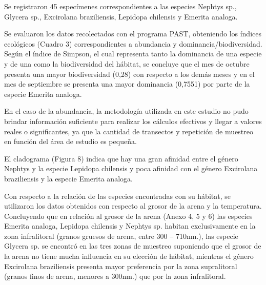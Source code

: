 \documentclass[5p,times,authoryear]{elsarticle}
\begin{document}
Se registraron 45 espec\'imenes correspondientes a las especies Nephtys sp., Glycera sp., Excirolana braziliensis, Lepidopa chilensis y Emerita analoga.

Se evaluaron los datos recolectados con el programa PAST, obteniendo los \'indices ecol\'ogicos (Cuadro 3) correspondientes a abundancia y dominancia/biodiversidad. Seg\'un el \'indice de Simpson, el cual representa tanto la dominancia de una especie y de una como la biodiversidad del h\'abitat, se concluye que el mes de octubre presenta una mayor biodiversidad (0,28) con respecto a los dem\'as meses y en el mes de septiembre se presenta una mayor dominancia (0,7551) por parte de la especie Emerita analoga. 

En el caso de la abundancia, la metodolog\'ia utilizada en este estudio no pudo brindar informaci\'on suficiente para realizar los c\'alculos efectivos y llegar a valores reales o significantes, ya que la cantidad de transectos y repetici\'on de muestreo en funci\'on del \'area de estudio es pequeña.

El cladograma (Figura 8) indica que hay una gran afinidad entre el g\'enero Nephtys y la especie Lepidopa chilensis y poca afinidad con el g\'enero Excirolana braziliensis y la especie Emerita analoga.

Con respecto a la relaci\'on de las especies encontradas con su h\'abitat, se utilizaron los datos obtenidos con respecto al grosor de la arena y la temperatura. Concluyendo que en relaci\'on al grosor de la arena (Anexo 4, 5 y 6) las especies Emerita analoga, Lepidopa chilensis y Nephtys sp. habitan exclusivamente en la zona infralitoral (granos gruesos de arena, entre 300 – 710nm.), las especie Glycera sp. se encontr\'o en las tres zonas de muestreo suponiendo que el grosor de la arena no tiene mucha influencia en su elecci\'on de h\'abitat, mientras el g\'enero Excirolana braziliensis presenta mayor preferencia por la zona supralitoral (granos finos de arena, menores a 300nm.) que por la zona infralitoral. 
\end{document}
